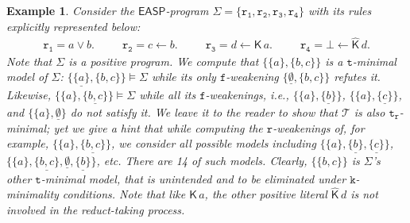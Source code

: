 \documentclass[submission,copyright,creativecommons]{eptcs}
\newcommand{\set}[1]  { \{ #1 \} }
\newcommand{\bigset}[1]  { \big\{ #1 \big\} }
\newcommand{\logic}[1]  { \ensuremath{\mathsf{#1}} }
\newcommand{\EASP}  { \logic{EASP} }
\newcommand{\K}  { \mathsf{K} }
\newcommand{\Khat}  { \hat{\mathsf{K}} }
\newcommand{\functional}  { \texttt{f} }
\newcommand{\relational}  { \texttt{r} }
\newcommand{\trelational}  { \texttt{t}_{\!\relational} }
\newtheorem{example}{Example}
\begin{document}
\begin{example} 
\label{ex: to understand t-min better}\normalfont
Consider the $\EASP$-program 
$\Sigma=\set{\mathtt{r_1}, \mathtt{r_2}, \mathtt{r_3}, \mathtt{r_4}}$
with its rules explicitly represented below:
%
\begin{align*}
\mathtt{r_1} = a \lor b.             \hspace{30pt} 
\mathtt{r_2} = c \leftarrow b.   \hspace{30pt} 
\mathtt{r_3} = d \leftarrow \K\,a. \hspace{30pt} 
\mathtt{r_4} = \bot \leftarrow \Khat\,d.
\end{align*}
Note that $\Sigma$ is a positive program.
%
We compute that $\bigset{\set a, \set {b, c}}$ is a 
$\texttt{t}$-minimal model of $\Sigma$:
$\bigset{\underline{\set a}, \set {b,c}} \models \Sigma$
while its only $\functional$-weakening 
$\bigset{\underline{\emptyset}, \set {b,c}}$ refutes it. Likewise,
$\bigset{\set a, \underline{\set {b,c}}} \models \Sigma$
while all its $\functional$-weakenings, i.e., $\bigset{\set a, \underline{\set {b}}}$, 
$\bigset{\set a, \underline{\set {c}}}$,
and $\bigset{\set a, \underline{\emptyset}}$ do not satisfy it.
We leave it to the reader to show that
$\mathcal T$ is also $\trelational$-minimal; yet
we give a hint that while computing the $\relational$-weakenings of, for example, 
$\bigset{\set a, \underline{\set {b,c}}}$, we consider 
all possible models
including $\bigset{\set a, \underline{\set b},\underline{\set c}}$, $\bigset{\set a, \underline{\set {b,c}}, \underline{\emptyset}, \underline{\set b}}$, etc. There are 14 of such models. 
Clearly, $\set{\set {b,c}}$ is $\Sigma$'s other $\texttt{t}$-minimal model,
that is unintended and to be eliminated under $\texttt{k}$-minimality conditions. 
Note that like $\K\,a$, the other positive literal $\Khat\,d$ is not 
involved in the reduct-taking process. 
\end{example}
%
\end{document}
